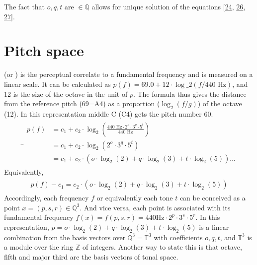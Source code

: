 \documentclass[letterpaper,10pt,english]{sphinxmanual}
\begin{document}
\sphinxAtStartPar
The fact that \(o, q, t\) are \(\in \mathbb Q\) allows for
unique solution of the equations
{[}\hyperlink{cite.8_bibliography:id36}{24}, \hyperlink{cite.8_bibliography:id35}{26}, \hyperlink{cite.8_bibliography:id4}{27}{]}.


\section{Pitch space}
\label{\detokenize{5_notes:pitch-space}}
\sphinxAtStartPar
{} (or ) is the perceptual correlate to a fundamental
frequency and is measured on a linear scale. It can be calculated as
\(p(f) = 69.0 + 12 \cdot \log\_2(f/440 \text{ Hz}) \), and 12 is the
size of the octave in the unit of \(p\). The formula thus gives the
distance from the reference pitch (69=A4) as a proportion
(\(\log_2(f/g)\)) of the octave (12). In this representation middle
C (C4) gets the pitch number 60.
\begin{equation*}
\begin{split}.. \begin{aligned}
 p(f) & = c_1+c_2\cdot \log_2\left(\frac{440 \text{ Hz}\cdot 2^o \cdot 3^q \cdot 5^t}{440\text{ Hz}}\right)\\
      & = c_1+c_2\cdot \log_2\left(2^o\cdot3^q\cdot5^t\right) \\
            & = c_1+c_2 \cdot (o\cdot\log_2(2) + q\cdot \log_2(3) + t\cdot\log_2(5) ).
.. \end{aligned}\end{split}
\end{equation*}
\sphinxAtStartPar
Equivalently,
\begin{equation*}
\begin{split}\begin{aligned}
  p(f)- c_1 = c_2 \cdot (o\cdot\log_2(2) + q\cdot \log_2(3) + t\cdot\log_2(5) )\end{aligned}\end{split}
\end{equation*}
\sphinxAtStartPar
Accordingly, each frequency \(f\) or equivalently each tone
\(t\) can be conceived as a point
\(x = (p, s, r) \in \mathbb Q^3\). And vice versa, each point is
associated with its fundamental frequency
\(f(x) = f(p, s, r) = 440 \text{Hz} \cdot 2^p \cdot 3^s \cdot 5^r\).
In this representation,
\(p = o \cdot \log_2(2) + q\cdot \log_2(3) + t\cdot \log_2(5)\) is a
linear combination from the basis vectors over
\(\mathbb Q^3 = \mathbb T^3\) with coefficients \(o, q, t\), and
\(\mathbb T^3\) is a module over the ring \(\mathbb Z\) of
integers. Another way to state this is that octave, fifth and major
third are the basis vectors of tonal space.
\end{document}
